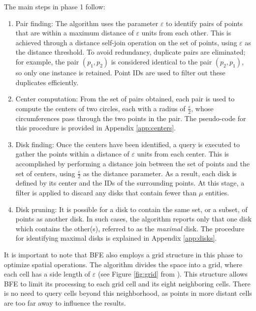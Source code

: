 The main steps in phase 1 follow:
\begin{enumerate}
    \item Pair finding:  The algorithm uses the parameter $\varepsilon$ to identify pairs of points that are within a maximum distance of $\varepsilon$ units from each other. This is achieved through a distance self-join operation on the set of points, using $\varepsilon$ as the distance threshold. To avoid redundancy, duplicate pairs are eliminated; for example, the pair $(p_1, p_2)$ is considered identical to the pair $(p_2, p_1)$, so only one instance is retained. Point IDs are used to filter out these duplicates efficiently.
    \item Center computation:  From the set of pairs obtained, each pair is used to compute the centers of two circles, each with a radius of $\frac{\varepsilon}{2}$, whose circumferences pass through the two points in the pair. The pseudo-code for this procedure is provided in Appendix \ref{app:centers}.
    \item Disk finding: Once the centers have been identified, a query is executed to gather the points within a distance of $\varepsilon$ units from each center. This is accomplished by performing a distance join between the set of points and the set of centers, using $\frac{\varepsilon}{2}$ as the distance parameter. As a result, each disk is defined by its center and the IDs of the surrounding points. At this stage, a filter is applied to discard any disks that contain fewer than $\mu$ entities.
    \item Disk pruning: It is possible for a disk to contain the same set, or a subset, of points as another disk. In such cases, the algorithm reports only that one disk which contains the other(s), referred to as the \textit{maximal} disk. The procedure for identifying maximal disks is explained in Appendix \ref{app:disks}.
\end{enumerate}

It is important to note that BFE also employs a grid structure in this phase to optimize spatial operations. The algorithm divides the space into a grid, where 
each cell has a side length of $\varepsilon$ (see Figure \ref{fig:grid} from \cite{vieira_-line_2009}). This structure allows BFE to limit its processing to 
each grid cell and its eight neighboring cells. There is no need to query cells beyond this neighborhood, as points in more distant cells are too far away to 
influence the results.

